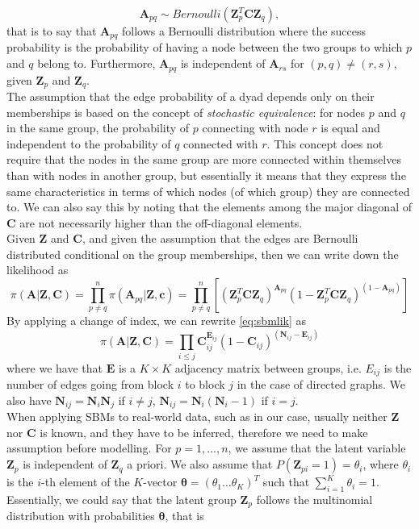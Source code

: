 \[
    \mathbf{A}_{pq} \sim Bernoulli(\mathbf{Z}^T_p \mathbf{C} \mathbf{Z}_q),
\]
that is to say that $\mathbf{A}_{pq}$ follows a Bernoulli distribution where the success probability is the probability of having a node between the two groups to which $p$ and $q$ belong to. Furthermore, $\mathbf{A}_{pq}$ is independent of $\mathbf{A}_{rs}$ for $(p,q) \neq (r,s)$, given $\mathbf{Z}_p$ and $\mathbf{Z}_q$.\\
The assumption that the edge probability of a dyad depends only on their memberships is based on the concept of \textit{stochastic equivalence}: for nodes $p$ and $q$ in the same group, the probability of $p$ connecting with node $r$ is equal and independent to the probability of $q$ connected with $r$. This concept does not require that the nodes in the same group are more connected within themselves than with nodes in another group, but essentially it means that they express the same characteristics in terms of which nodes (of which group) they are connected to. We can also say this by noting that the elements among the major diagonal of $\mathbf{C}$ are not necessarily higher than the off-diagonal elements.\\
Given $\mathbf{Z}$ and $\mathbf{C}$, and given the assumption that the edges are Bernoulli distributed conditional on the group memberships, then we can write down the likelihood as 
\begin{equation}\label{eq:sbmlik}
    \pi (\mathbf{A}|\mathbf{Z},\mathbf{C}) = \prod_{p\neq q}^n \pi(\mathbf{A}_{pq}|\mathbf{Z},\mathbf{c}) 
    = \prod_{p\neq q}^n \left[ \left( \mathbf{Z}^T_p \mathbf{C} \mathbf{Z}_q \right)^{\mathbf{A}_{pq}} \left( 1 - \mathbf{Z}^T_p \mathbf{C} \mathbf{Z}_q \right)^{(1-\mathbf{A}_{pq})} \right]
\end{equation}
By applying a change of index, we can rewrite \ref{eq:sbmlik} as
\begin{equation}
    \pi (\mathbf{A}|\mathbf{Z},\mathbf{C}) = \prod_{i \leq j} \mathbf{C}^{\mathbf{E}_{ij}}_{ij} (1 - \mathbf{C}_{ij})^{(\mathbf{N}_{ij} - \mathbf{E}_{ij})}
\end{equation}
where we have that $\mathbf{E}$ is a $K \times K$ adjacency matrix between groups, i.e. $E_{ij}$ is the number of edges going from block $i$ to block $j$ in the case of directed graphs. We also have $\mathbf{N}_{ij} = \mathbf{N}_i\mathbf{N}_j$ if $i \neq j$, $\mathbf{N}_{ij} = \mathbf{N}_i(\mathbf{N}_i-1)$ if $i=j$.\\
When applying SBMs to real-world data, such as in our case, usually neither $\mathbf{Z}$ nor $\mathbf{C}$ is known, and they have to be inferred, therefore we need to make assumption before modelling. For $p = 1,...,n$, we assume that the latent variable $\mathbf{Z}_p$ is independent of $\mathbf{Z}_q$ a priori. We also assume that $P(\mathbf{Z}_{pi}=1) = \theta_i$, where $\theta_i$ is the $i$-th element of the $K$-vector $\mathbf{\theta} = (\theta_1 \dots \theta_K)^T$ such that $\sum_{i=1}^K \theta_i = 1$. Essentially, we could say that the latent group $\mathbf{Z}_p$ follows the multinomial distribution with probabilities $\mathbf{\theta}$, that is
